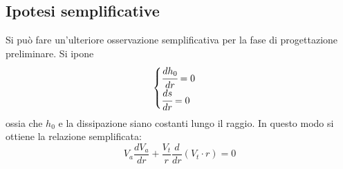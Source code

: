 \subsection{Ipotesi semplificative}
Si può fare un'ulteriore osservazione semplificativa per la fase di progettazione preliminare. Si ipone
\begin{align*}
\begin{cases}
\cfrac{dh_0}{dr} = 0\\
\cfrac{ds}{dr} = 0 
\end{cases}
\end{align*}
ossia che $h_0$ e la dissipazione siano costanti lungo il raggio. In questo modo si ottiene la relazione semplificata:
\begin{equation}
\boxed{ V_a \frac{d V_a}{dr} + \frac{V_t}{r} \frac{d}{dr}(V_t \cdot r) = 0}
\label{eq:EquilibrioRadSemp}
\end{equation}
